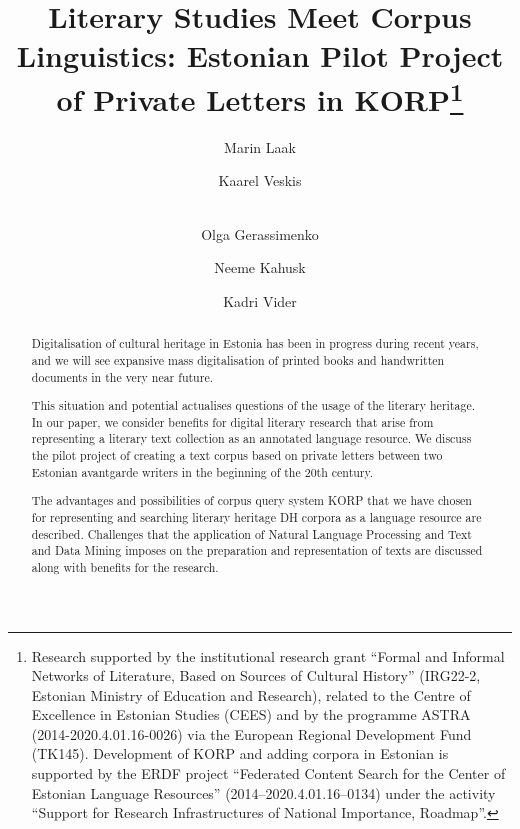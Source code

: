 \documentclass[runningheads]{llncs}
\begin{document}
%
\title{Literary Studies Meet Corpus Linguistics: Estonian Pilot Project of Private Letters in KORP\thanks{Research supported by the institutional research grant ``Formal and Informal Networks of Literature, Based on Sources of Cultural History'' (IRG22-2, Estonian Ministry of Education and Research), related to the Centre of Excellence in Estonian Studies (CEES) and by the programme ASTRA (2014-2020.4.01.16-0026) via the European Regional Development Fund (TK145).  Development of KORP and adding corpora in Estonian is supported by the ERDF project ``Federated Content Search for the Center of Estonian Language Resources'' (2014--2020.4.01.16--0134) under the activity ``Support for Research Infrastructures of National Importance, Roadmap''.}}
%
%
\author{Marin Laak \and Kaarel Veskis \and\\
Olga Gerassimenko \and Neeme Kahusk \and
Kadri Vider}
%
%
%
\maketitle              %
%
\begin{abstract}
  Digitalisation of cultural heritage in Estonia has been in progress during recent years, and we will see expansive mass digitalisation of printed books and handwritten documents in the very near future.
  
  This situation and potential actualises questions of the usage of the literary heritage. In our paper, we consider benefits for digital literary research that arise from representing a literary text collection as an annotated language resource. We discuss the pilot project of creating a text corpus based on private letters between two Estonian avantgarde writers in the beginning of the 20th century.
  
The advantages and possibilities of corpus query system KORP that we have chosen for representing and searching literary heritage DH corpora as a language resource are described. Challenges that the application of Natural Language Processing and Text and Data Mining imposes on the preparation and representation of texts are discussed along with benefits for the research. 



\end{abstract}
%
%
%
\end{document}
